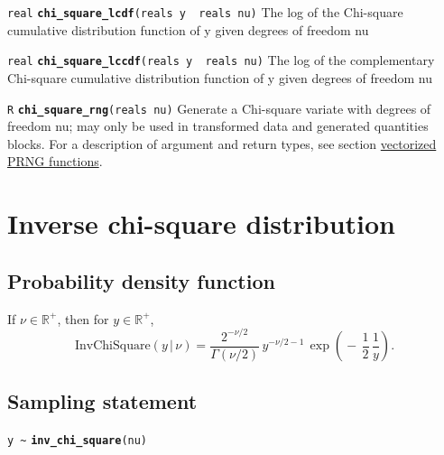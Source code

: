 \documentclass[
  10pt,
]{book}
\begin{document}

\texttt{real} \textbf{\texttt{chi\_square\_lcdf}}\texttt{(reals\ y\ \textbar{}\ reals\ nu)}\newline
The log of the Chi-square cumulative distribution function of y given
degrees of freedom nu


\texttt{real} \textbf{\texttt{chi\_square\_lccdf}}\texttt{(reals\ y\ \textbar{}\ reals\ nu)}\newline
The log of the complementary Chi-square cumulative distribution
function of y given degrees of freedom nu


\texttt{R} \textbf{\texttt{chi\_square\_rng}}\texttt{(reals\ nu)}\newline
Generate a Chi-square variate with degrees of freedom nu; may only be
used in transformed data and generated quantities blocks.
For a description of argument and return types, see section
\protect\hyperlink{prng-vectorization}{vectorized PRNG functions}.

\hypertarget{inverse-chi-square-distribution}{%
\section{Inverse chi-square distribution}\label{inverse-chi-square-distribution}}

\hypertarget{probability-density-function-10}{%
\subsection{Probability density function}\label{probability-density-function-10}}

If \(\nu \in \mathbb{R}^+\), then for \(y \in \mathbb{R}^+\), \[
\text{InvChiSquare}(y \, | \, \nu) = \frac{2^{-\nu/2}}    {\Gamma(\nu
/ 2)} \, y^{-\nu/2 - 1} \, \exp\! \left( \! - \, \frac{1}{2} \,
\frac{1}{y} \right) . \]

\hypertarget{sampling-statement-34}{%
\subsection{Sampling statement}\label{sampling-statement-34}}

\texttt{y\ \textasciitilde{}} \textbf{\texttt{inv\_chi\_square}}\texttt{(nu)}
\end{document}
